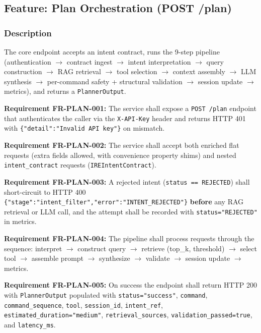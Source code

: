 \documentclass[10pt,journal,onecolumn]{IEEEtran}
\newcommand{\reqid}[1]{\textbf{#1}}
\begin{document}
\subsection{Feature: Plan Orchestration (POST /plan)}

\subsubsection{Description}

The core endpoint accepts an intent contract, runs the 9-step pipeline (authentication $\rightarrow$ contract ingest $\rightarrow$ intent interpretation $\rightarrow$ query construction $\rightarrow$ RAG retrieval $\rightarrow$ tool selection $\rightarrow$ context assembly $\rightarrow$ LLM synthesis $\rightarrow$ per-command safety + structural validation $\rightarrow$ session update $\rightarrow$ metrics), and returns a \texttt{PlannerOutput}.

\reqid{Requirement FR-PLAN-001:} The service shall expose a \texttt{POST /plan} endpoint that authenticates the caller via the \texttt{X-API-Key} header and returns HTTP 401 with \texttt{\{"detail":\allowbreak  "Invalid API key"\}} on mismatch.

\reqid{Requirement FR-PLAN-002:} The service shall accept both enriched flat requests (extra fields allowed, with convenience property shims) and nested \texttt{intent\_contract} requests (\texttt{IREIntentContract}).

\reqid{Requirement FR-PLAN-003:} A rejected intent (\texttt{status == REJECTED}) shall short-circuit to HTTP 400 \texttt{\{"stage":\allowbreak "intent\_\allowbreak filter","error":\allowbreak "INTENT\_\allowbreak REJECTED"\}} \textbf{before} any RAG retrieval or LLM call, and the attempt shall be recorded with \texttt{status="REJECTED"} in metrics.

\reqid{Requirement FR-PLAN-004:} The pipeline shall process requests through the sequence: interpret $\rightarrow$ construct query $\rightarrow$ retrieve (top\_k, threshold) $\rightarrow$ select tool $\rightarrow$ assemble prompt $\rightarrow$ synthesize $\rightarrow$ validate $\rightarrow$ session update $\rightarrow$ metrics.

\reqid{Requirement FR-PLAN-005:} On success the endpoint shall return HTTP 200 with \texttt{PlannerOutput} populated with \texttt{status="success"}, \texttt{command}, \texttt{command\_sequence}, \texttt{tool}, \texttt{session\_id}, \texttt{intent\_ref}, \texttt{estimated\_\allowbreak duration="medium"}, \texttt{retrieval\_sources}, \texttt{validation\_passed=true}, and \texttt{latency\_ms}.
\end{document}
